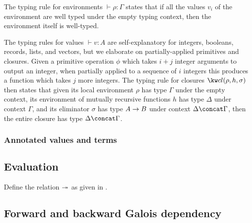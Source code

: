 The typing rule for environments $\vdash \rho: \Gamma$ states that if all the values $v_i$ of the environment are well typed under the empty typing context, then the environment itself is well-typed. 

The typing rules for values $\vdash v: A$ are self-explanatory for integers, booleans, records, lists, and vectors, but we elaborate on partially-applied primitives and closures. Given a primitive operation $\phi$ which takes $i+j$ integer arguments to output an integer, when partially applied to a sequence of $i$ integers this produces a function which takes $j$ more integers. The typing rule for closures $\exClosure{\rho}{h}{\sigma}$ then states that given its local environment $\rho$ has type $\Gamma$ under the empty context, its environment of mutually recursive functions $h$ has type $\Delta$ under context $\Gamma$, and its eliminator $\sigma$ has type ${A}\rightarrow{B}$ under context $\Delta \concat \Gamma$, then the entire closure has type $\Delta \concat \Gamma$.



\subsubsection{Annotated values and terms}






\subsection{Evaluation}




\begin{definition}
   \label{def:core-language:closeDefs}
   Define the relation $\twoheadrightarrow$ as given in .
\end{definition}

\subsection{Forward and backward Galois dependency}



